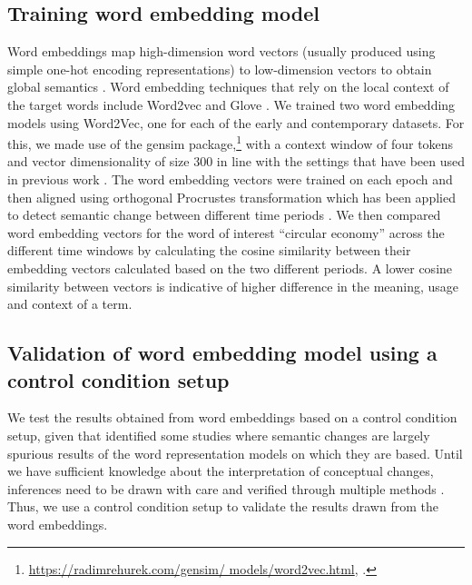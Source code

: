 \documentclass[output=paper]{langsci/langscibook}
\begin{document}
\subsection{Training word embedding model}
Word embeddings map high-dimension word vectors (usually produced using simple one-hot encoding representations) to low-dimension vectors to obtain global semantics \citep{tang2018state}. Word embedding techniques that rely on the local context of the target words include Word2vec \citep{mikolov2013efficient} and Glove \citep{pennington-etal-2014-glove}. We trained two word embedding models using Word2Vec, one for each of the early and contemporary datasets. For this, we made use of the gensim package,\footnote{\url{https://radimrehurek.com/gensim/ models/word2vec.html}, \citet{rehurek_lrec}.} with a context window of four tokens and vector dimensionality of size 300 in line with the settings that have been used in previous work \citep{hamilton-etal-2016-diachronic}. The word embedding vectors were trained on each epoch and then aligned using orthogonal Procrustes transformation \citep{schonemann1966generalized} which has been applied to detect semantic change between different time periods \citep{hamilton-etal-2016-diachronic,dubossarsky-etal-2017-outta, abercrombie2019semantic}. We then compared word embedding vectors for the word of interest ``circular economy'' across the different time windows by calculating the cosine similarity between their embedding vectors calculated based on the two different periods. A lower cosine similarity between vectors is indicative of higher difference in the meaning, usage and context of a term.
\subsection{Validation of word embedding model using a control condition setup}
We test the results obtained from word embeddings based on a control condition setup, given that \citet{dubossarsky-etal-2017-outta} identified some studies where semantic changes are largely spurious results of the word representation models on which they are based. Until we have sufficient knowledge about the interpretation of conceptual changes, inferences need to be drawn with care and verified through multiple methods \citep{sommerauer2019conceptual}. Thus, we use a control condition setup to validate the results drawn from the word embeddings. 
\end{document}
